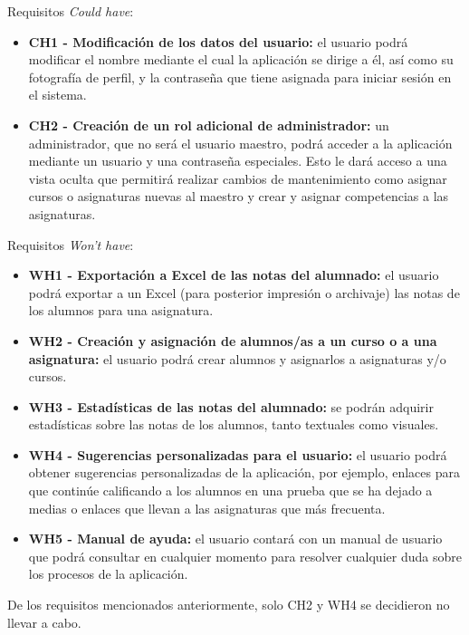Requisitos \textit{Could have}:
\begin{itemize}
	\item \textbf{CH1 - Modificación de los datos del usuario:} el usuario podrá modificar el nombre mediante el cual la aplicación se dirige a él, así como su fotografía de perfil, y la contraseña que tiene asignada para iniciar sesión en el sistema.
	\item \textbf{CH2 - Creación de un rol adicional de administrador:} un administrador, que no será el usuario maestro, podrá acceder a la aplicación mediante un usuario y una contraseña especiales. Esto le dará acceso a una vista oculta que permitirá realizar cambios de mantenimiento como asignar cursos o asignaturas nuevas al maestro y crear y asignar competencias a las asignaturas.
\end{itemize}

Requisitos \textit{Won't have}:
\begin{itemize}
	\item \textbf{WH1 - Exportación a Excel de las notas del alumnado:} el usuario podrá exportar a un Excel (para posterior impresión o archivaje) las notas de los alumnos para una asignatura.
	\item \textbf{WH2 - Creación y asignación de alumnos/as a un curso o a una asignatura:} el usuario podrá crear alumnos y asignarlos a asignaturas y/o cursos.
	\item \textbf{WH3 - Estadísticas de las notas del alumnado:} se podrán adquirir estadísticas sobre las notas de los alumnos, tanto textuales como visuales.
	\item \textbf{WH4 - Sugerencias personalizadas para el usuario:} el usuario podrá obtener sugerencias personalizadas de la aplicación, por ejemplo, enlaces para que continúe calificando a los alumnos en una prueba que se ha dejado a medias o enlaces que llevan a las asignaturas que más frecuenta.
	\item \textbf{WH5 - Manual de ayuda:} el usuario contará con un manual de usuario que podrá consultar en cualquier momento para resolver cualquier duda sobre los procesos de la aplicación.
\end{itemize}


De los requisitos mencionados anteriormente, solo CH2 y WH4 se decidieron no llevar a cabo.

